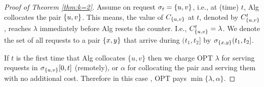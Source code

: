 \documentclass[manuscript,screen=true, review, anonymous]{acmart}
\DeclarePairedDelimiter\set{\{}{\}}
\begin{document}
\begin{proof}[Proof of Theorem \ref{thm:k=2}]
	Assume on request $\sigma_{t}=\set{u,v}$, 
	i.e., at (time) $t$,
	Alg collocates the pair $\set{u,v}$.
	This means,
	the value of $C_{\set{u,v}}$ at $t$,
	denoted by $C^t_{\set{u,v}}$, 
	reaches $\lambda$ immediately before Alg resets the counter.
	I.e.,
	$ C^t_{\set{u,v}} = \lambda$.
	We denote the set of all requests to a pair $\set{x,y}$ that arrive
	during $(t_1,t_2]$ by $\sigma_{\set{x,y}}(t_1,t_2]$.
	
	If $t$ is the first time that Alg collocates $\{u,v\}$ then we  charge
	OPT $\lambda$ for serving requests in $\sigma_{\set{u,v}}[0,t]$ (remotely),
	or $\alpha$ for collocating the pair and serving them with no additional cost.
	Therefore in this case ,
	OPT pays $\min{\{ \lambda,\alpha \}}$.
	

\end{proof}
\end{document}
